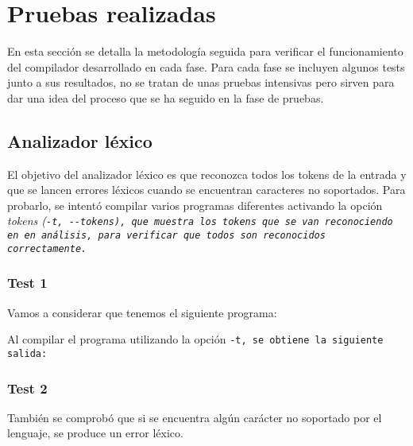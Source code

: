 \section{Pruebas realizadas}
En esta sección se detalla la metodología seguida para verificar el funcionamiento del compilador desarrollado en cada fase. Para cada fase se incluyen algunos tests junto a sus resultados, no se tratan de unas pruebas intensivas pero sirven para dar una idea del proceso que se ha seguido en la fase de pruebas.

\subsection{Analizador léxico}
El objetivo del analizador léxico es que reconozca todos los tokens de la entrada y que se lancen errores léxicos cuando se encuentran caracteres no soportados. Para probarlo, se intentó compilar varios programas diferentes activando la opción \it{tokens} (\tt{-t}, \tt{-{}-tokens}), que muestra los tokens que se van reconociendo en en análisis, para verificar que todos son reconocidos correctamente.

\subsubsection{Test 1}
Vamos a considerar que tenemos el siguiente programa:

\begin{codigo}[style=minileng,numbers=left]
\end{codigo}

Al compilar el programa utilizando la opción \tt{-t}, se obtiene la siguiente salida:
\noindent\begin{minipage}{.45\textwidth}
\begin{codigo}
\end{codigo}
\end{minipage}\hfill
\begin{minipage}{.45\textwidth}
\begin{codigo}
\end{codigo}
\end{minipage}

\begin{codigo}
\end{codigo}

\subsubsection{Test 2}
También se comprobó que si se encuentra algún carácter no soportado por el lenguaje, se produce un error léxico.

